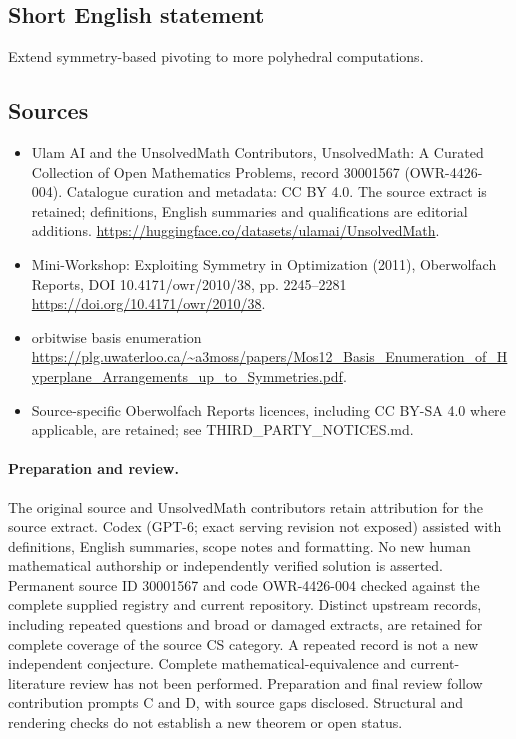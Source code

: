 \documentclass[11pt]{article}
\begin{document}
\subsection{Short English statement}
Extend symmetry-based pivoting to more polyhedral computations.
\subsection{Sources}
\begin{itemize}
\item[\hypertarget{source:30001567:1}{S1}] Ulam AI and the UnsolvedMath Contributors, UnsolvedMath: A Curated Collection of Open Mathematics Problems, record 30001567 (OWR-4426-004). Catalogue curation and metadata: CC BY 4.0. The source extract is retained; definitions, English summaries and qualifications are editorial additions.
\url{https://huggingface.co/datasets/ulamai/UnsolvedMath}.
\item[\hypertarget{source:30001567:2}{S2}] Mini-Workshop: Exploiting Symmetry in Optimization (2011), Oberwolfach Reports, DOI 10.4171/owr/2010/38, pp. 2245--2281
\url{https://doi.org/10.4171/owr/2010/38}.
\item[\hypertarget{source:30001567:3}{S3}] orbitwise basis enumeration
\url{https://plg.uwaterloo.ca/~a3moss/papers/Mos12_Basis_Enumeration_of_Hyperplane_Arrangements_up_to_Symmetries.pdf}.
\item Source-specific Oberwolfach Reports licences, including CC BY-SA 4.0 where applicable, are retained; see THIRD\_PARTY\_NOTICES.md.
\end{itemize}
\paragraph{Preparation and review.}
The original source and UnsolvedMath contributors retain attribution for the source extract. Codex (GPT-6; exact serving revision not exposed) assisted with definitions, English summaries, scope notes and formatting. No new human mathematical authorship or independently verified solution is asserted. Permanent source ID 30001567 and code OWR-4426-004 checked against the complete supplied registry and current repository. Distinct upstream records, including repeated questions and broad or damaged extracts, are retained for complete coverage of the source CS category. A repeated record is not a new independent conjecture. Complete mathematical-equivalence and current-literature review has not been performed. Preparation and final review follow contribution prompts C and D, with source gaps disclosed. Structural and rendering checks do not establish a new theorem or open status.
\label{end:30001567}
\end{document}
